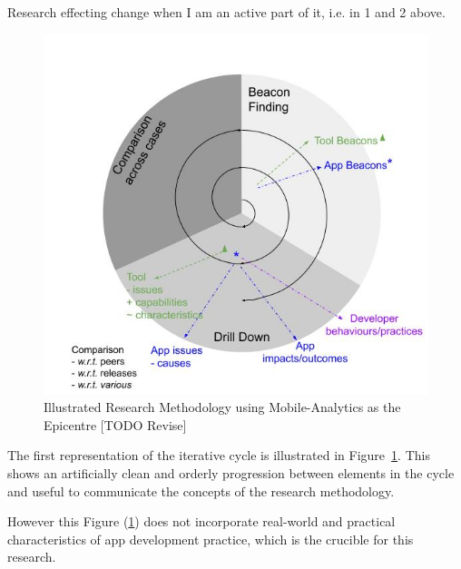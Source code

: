Research effecting change when I am an active part of it, i.e. in 1 and 2 above.




\begin{figure}
    \centering
    \includegraphics[width=14cm]{images/my/Illustrated-Research-Methodology-using-Mobile-Analytics-as-the-Epicentre-v0-2.jpeg}
    \caption{Illustrated Research Methodology using Mobile-Analytics as the Epicentre [TODO Revise]}
    \label{fig:Illustrated-Research-Methodology-using-Mobile-Analytics-as-the-Epicentre}
\end{figure}

The first representation of the iterative cycle is illustrated in Figure~\ref{fig:Illustrated-Research-Methodology-using-Mobile-Analytics-as-the-Epicentre}. This shows an artificially clean and orderly progression between elements in the cycle and useful to communicate the concepts of the research methodology. 

However this Figure (\ref{fig:Illustrated-Research-Methodology-using-Mobile-Analytics-as-the-Epicentre}) does not incorporate real-world and practical characteristics of app development practice, which is the crucible for this research.